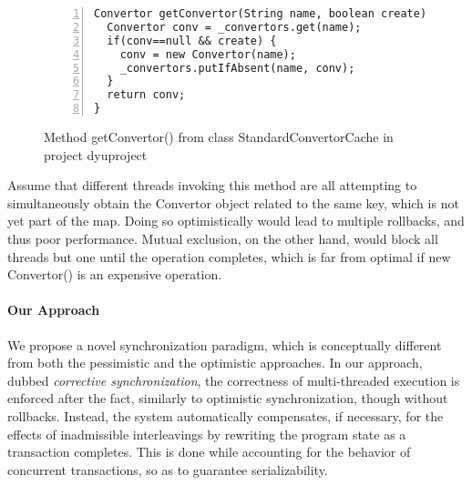 
\begin{figure}
	\begin{lstlisting}[numbers=left]
Convertor getConvertor(String name, boolean create) {
  Convertor conv = _convertors.get(name);
  if(conv==null && create) {
    conv = new Convertor(name);
    _convertors.putIfAbsent(name, conv);
  }
  return conv;
}
	\end{lstlisting}
	\caption{\label{Fi:introMotivating}Method {\sf getConvertor()} from class {\sf StandardConvertorCache} in project {\sf dyuproject}}
\end{figure}


Assume that different threads invoking this method are all attempting to simultaneously obtain the {\sf Convertor} object related to the same key, which is not yet part of the map. Doing so optimistically would lead to multiple rollbacks, and thus poor performance. Mutual exclusion, on the other hand, would block all threads but one until the operation completes, which is far from optimal if {\sf new Convertor()} is an expensive operation.

\paragraph{Our Approach} We propose a novel synchronization paradigm, which is conceptually different from both the pessimistic and the optimistic approaches. In our approach, dubbed \emph{corrective synchronization}, the correctness of multi-threaded execution is enforced after the fact, similarly to optimistic synchronization, though without rollbacks. Instead, the system automatically compensates, if necessary, for the effects of inadmissible interleavings by rewriting the program state as a transaction completes. This is done while accounting for the behavior of concurrent transactions, so as to guarantee serializability.

